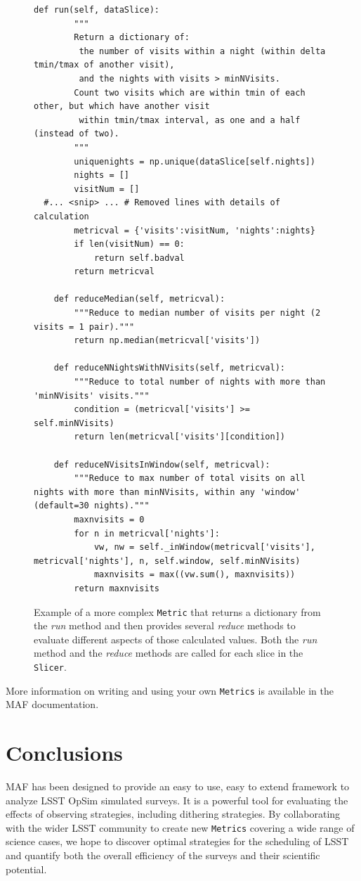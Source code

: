 \documentclass[]{spie}  %
\begin{document}
{\begin{figure}
\begin{lstlisting}[frame=single]
    def run(self, dataSlice):
        """
        Return a dictionary of:
         the number of visits within a night (within delta tmin/tmax of another visit),
         and the nights with visits > minNVisits.
        Count two visits which are within tmin of each other, but which have another visit
         within tmin/tmax interval, as one and a half (instead of two).
        """
        uniquenights = np.unique(dataSlice[self.nights])
        nights = []
        visitNum = []
  #... <snip> ... # Removed lines with details of calculation
        metricval = {'visits':visitNum, 'nights':nights}
        if len(visitNum) == 0:
            return self.badval
        return metricval
        
    def reduceMedian(self, metricval):
        """Reduce to median number of visits per night (2 visits = 1 pair)."""
        return np.median(metricval['visits'])
        
    def reduceNNightsWithNVisits(self, metricval):
        """Reduce to total number of nights with more than 'minNVisits' visits."""
        condition = (metricval['visits'] >= self.minNVisits)
        return len(metricval['visits'][condition])

    def reduceNVisitsInWindow(self, metricval):
        """Reduce to max number of total visits on all nights with more than minNVisits, within any 'window' (default=30 nights)."""
        maxnvisits = 0
        for n in metricval['nights']:
            vw, nw = self._inWindow(metricval['visits'], metricval['nights'], n, self.window, self.minNVisits)
            maxnvisits = max((vw.sum(), maxnvisits))
        return maxnvisits
\end{lstlisting}
\caption[]
{\label{fig:visitgroups} Example of a more complex {\tt Metric} that returns
a dictionary from the {\it run} method and then provides several {\it
  reduce} methods to evaluate different aspects of those calculated
values. Both the {\it run} method and the {\it reduce} methods are
called for each slice in the {\tt Slicer}.}
\end{figure}

More information on writing and using your own {\tt Metrics} is available in
the MAF documentation. 


\section{Conclusions}

MAF has been designed to provide an easy to use, easy to extend
framework to analyze LSST OpSim simulated surveys. It is a powerful
tool for evaluating the effects of observing strategies, including
dithering strategies.  By collaborating with the wider LSST community
to create new {\tt Metrics} covering a wide range of science cases, we hope
to discover optimal strategies for the scheduling of LSST and quantify
both the overall efficiency of the surveys and their scientific
potential.

}
\end{document}
